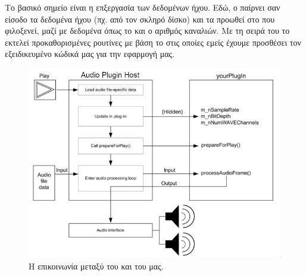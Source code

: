\documentclass[12pt]{extarticle}
\begin{document}
Το βασικό σημείο είναι η επξεργασία των δεδομένων ήχου. Εδώ, 
ο  παίρνει σαν είσοδο τα δεδομένα ήχου (πχ. από τον σκληρό δίσκο) 
και τα προωθεί στο  που φιλοξενεί, μαζί με δεδομένα όπως 
το  και ο αριθμός καναλιών.
Με τη σειρά του το  εκτελεί προκαθορισμένες ρουτίνες με βάση το 
στις οποίες εμείς έχουμε προσθέσει τον εξειδικευμένο κώδικά μας για την εφαρμογή μας.

\begin{figure}[!htb]
    \centering
    \includegraphics[width=\textwidth]{./assets/events.png}
    \caption{Η επικοινωνία μεταξύ του  και του  μας.}
\end{figure}
\end{document}
